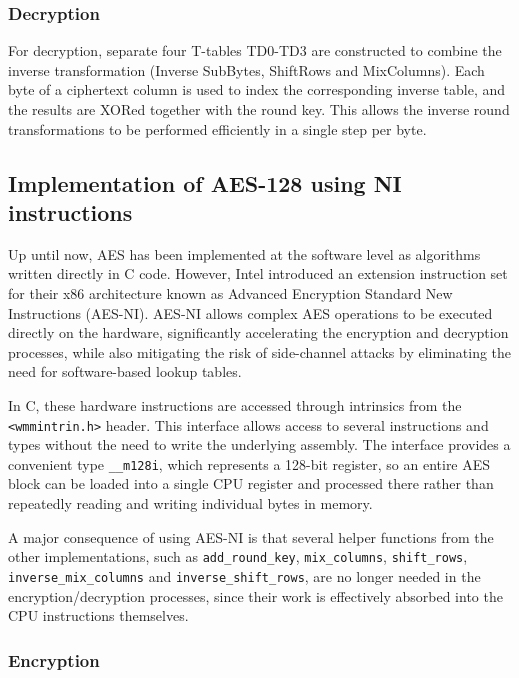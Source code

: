 \subsubsection{Decryption}

For decryption, separate four T-tables TD0-TD3 are constructed to combine the inverse transformation (Inverse SubBytes, ShiftRows and MixColumns). Each byte of a ciphertext column is used to index the corresponding inverse table, and the results are XORed together with the round key. This allows the inverse round transformations to be performed efficiently in a single step per byte.

\subsection{Implementation of AES-128 using NI instructions}

Up until now, AES has been implemented at the software level as algorithms written directly in C code. However, Intel introduced an extension instruction set for their x86 architecture known as Advanced Encryption Standard New Instructions (AES-NI). AES-NI allows complex AES operations to be executed directly on the hardware, significantly accelerating the encryption and decryption processes, while also mitigating the risk of side-channel attacks by eliminating the need for software-based lookup tables.

In C, these hardware instructions are accessed through intrinsics from the \texttt{\textless wmmintrin.h\textgreater} header. This interface allows access to several instructions and types without the need to write the underlying assembly. The interface provides a convenient type \texttt{\_\_m128i}, which represents a 128-bit register, so an entire AES block can be loaded into a single CPU register and processed there rather than repeatedly reading and writing individual bytes in memory.

A major consequence of using AES-NI is that several helper functions from the other implementations, such as \texttt{add\_round\_key}, \texttt{mix\_columns}, \texttt{shift\_rows}, \texttt{inverse\_mix\_columns} and \texttt{inverse\_shift\_rows}, are no longer needed in the encryption/decryption processes, since their work is effectively absorbed into the CPU instructions themselves.

\subsubsection{Encryption}

